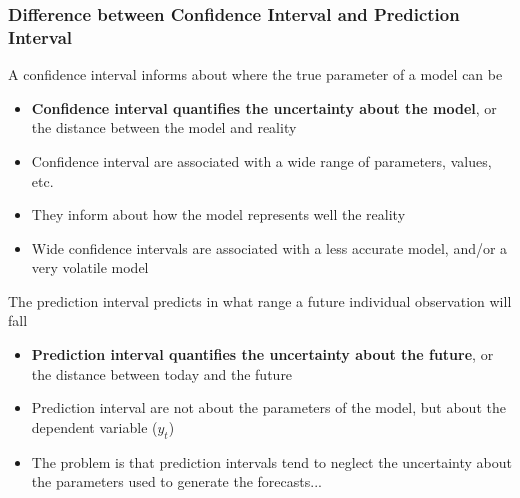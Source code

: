 \documentclass{beamer}
\newenvironment{wideitemize}{\itemize\addtolength{\itemsep}{10pt}}{\enditemize}
\begin{document}
\begin{frame}
  \frametitle{Difference between Confidence Interval and Prediction Interval}
  \begin{wideitemize}


 \item A confidence interval informs about where the true parameter of a model can be
   \begin{itemize}
     \item \textbf{Confidence interval quantifies the uncertainty about the model}, or the distance between the model and reality
     \item Confidence interval are associated with a wide range of parameters, values, etc.
     \item They inform about how the model represents well the reality
     \item Wide confidence intervals are associated with a less accurate model, and/or a very volatile model
   \end{itemize}

    
  \item The prediction interval predicts in what range a future individual observation will fall
    \begin{itemize}
      \item \textbf{Prediction interval quantifies the uncertainty about the future}, or the distance between today and the future
      \item Prediction interval are not about the parameters of the model, but about the dependent variable ($y_t$)
      \item The problem is that prediction intervals tend to neglect the uncertainty about the parameters used to generate the forecasts...
    \end{itemize}   
  \end{wideitemize}
  
\end{frame}
\end{document}
